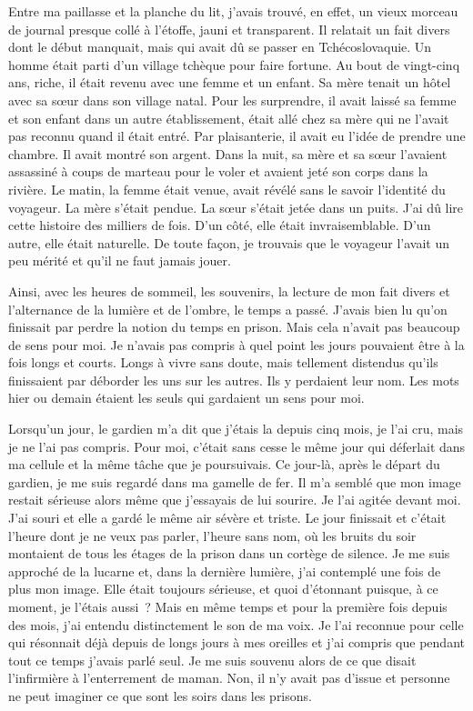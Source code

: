 \documentclass[french,twoside]{book} %
\newcommand\chapterclose{} %
\begin{document}
Entre ma paillasse et la planche du lit, j’avais trouvé, en effet, un vieux morceau de journal presque collé à l’étoffe, jauni et transparent. Il relatait un fait divers dont le début manquait, mais qui avait dû se passer en Tchécoslovaquie. Un homme était parti d’un village tchèque pour faire fortune. Au bout de vingt-cinq ans, riche, il était revenu avec une femme et un enfant. Sa mère tenait un hôtel avec sa sœur dans son village natal. Pour les surprendre, il avait laissé sa femme et son enfant dans un autre établissement, était allé chez sa mère qui ne l’avait pas reconnu quand il était entré. Par plaisanterie, il avait eu l’idée de prendre une chambre. Il avait montré son argent. Dans la nuit, sa mère et sa sœur l’avaient assassiné à coups de marteau pour le voler et avaient jeté son corps dans la rivière. Le matin, la femme était venue, avait révélé sans le savoir l’identité du voyageur. La mère s’était pendue. La sœur s’était jetée dans un puits. J'ai dû lire cette histoire des milliers de fois. D'un côté, elle était invraisemblable. D'un autre, elle était naturelle. De toute façon, je trouvais que le voyageur l’avait un peu mérité et qu’il ne faut jamais jouer.\par
Ainsi, avec les heures de sommeil, les souvenirs, la lecture de mon fait divers et l’alternance de la lumière et de l’ombre, le temps a passé. J'avais bien lu qu’on finissait par perdre la notion du temps en prison. Mais cela n’avait pas beaucoup de sens pour moi. Je n’avais pas compris à quel point les jours pouvaient être à la fois longs et courts. Longs à vivre sans doute, mais tellement distendus qu’ils finissaient par déborder les uns sur les autres. Ils y perdaient leur nom. Les mots hier ou demain étaient les seuls qui gardaient un sens pour moi.\par
Lorsqu’un jour, le gardien m’a dit que j’étais la depuis cinq mois, je l’ai cru, mais je ne l’ai pas compris. Pour moi, c’était sans cesse le même jour qui déferlait dans ma cellule et la même tâche que je poursuivais. Ce jour-là, après le départ du gardien, je me suis regardé dans ma gamelle de fer. Il m’a semblé que mon image restait sérieuse alors même que j’essayais de lui sourire. Je l’ai agitée devant moi. J'ai souri et elle a gardé le même air sévère et triste. Le jour finissait et c’était l’heure dont je ne veux pas parler, l’heure sans nom, où les bruits du soir montaient de tous les étages de la prison dans un cortège de silence. Je me suis approché de la lucarne et, dans la dernière lumière, j’ai contemplé une fois de plus mon image. Elle était toujours sérieuse, et quoi d’étonnant puisque, à ce moment, je l’étais aussi ? Mais en même temps et pour la première fois depuis des mois, j’ai entendu distinctement le son de ma voix. Je l’ai reconnue pour celle qui résonnait déjà depuis de longs jours à mes oreilles et j’ai compris que pendant tout ce temps j’avais parlé seul. Je me suis souvenu alors de ce que disait l’infirmière à l’enterrement de maman. Non, il n’y avait pas d’issue et personne ne peut imaginer ce que sont les soirs dans les prisons.
\chapterclose
\end{document}
